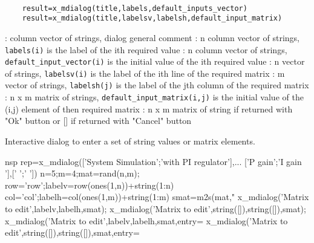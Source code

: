 
\begin{mandesc}
   \\ %
\end{mandesc}
\label{x-mdialog}
\begin{calling_sequence}
  \begin{verbatim}
    result=x_mdialog(title,labels,default_inputs_vector)   
    result=x_mdialog(title,labelsv,labelsh,default_input_matrix)   
  \end{verbatim}
\end{calling_sequence}

\begin{parameters}
  \begin{varlist}
    : column vector of strings, dialog general comment
    : n column vector of strings, \verb!labels(i)! is the label of  the ith required value
    : n  column vector of strings, \verb!default_input_vector(i)! is the initial 
    value of  the ith required value
    : n  vector of strings, \verb!labelsv(i)! is the label of  the ith line of the required matrix
    : m  vector of strings, \verb!labelsh(j)! is the label of  the jth column of the required matrix
    : n x m matrix of strings, \verb!default_input_matrix(i,j)! is the initial value of the (i,j) element of then required matrix
    : n x m matrix of string if returned with "Ok" button or [] if returned with "Cancel" button
  \end{varlist}
\end{parameters}
\begin{mandescription}
  Interactive dialog to enter a set of string values or matrix elements.
\end{mandescription}
\begin{examples}
\begin{mintednsp}{nsp}
rep=x_mdialog(['System Simulation';'with PI regulator'],...
              ['P gain';'I gain '],[' ';' '])
n=5;m=4;mat=rand(n,m);
row='row';labelv=row(ones(1,n))+string(1:n)
col='col';labelh=col(ones(1,m))+string(1:m)
smat=m2s(mat,"%
x_mdialog('Matrix to edit',labelv,labelh,smat);
x_mdialog('Matrix to edit',string([]),string([]),smat);
x_mdialog('Matrix to edit',labelv,labelh,smat,entry=%
x_mdialog('Matrix to edit',string([]),string([]),smat,entry=%
\end{mintednsp}
\end{examples}
\begin{manseealso}
\end{manseealso}

